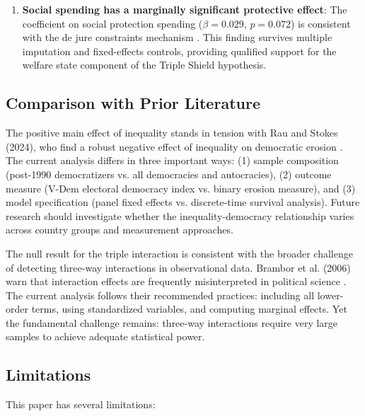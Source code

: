 \documentclass[11pt,letterpaper]{article}
\begin{document}
\begin{enumerate}
    \item \textbf{Social spending has a marginally significant protective effect}: The coefficient on social protection spending ($\beta = 0.029$, $p = 0.072$) is consistent with the de jure constraints mechanism \cite{Orenstein2008, Haggard2021}. This finding survives multiple imputation and fixed-effects controls, providing qualified support for the welfare state component of the Triple Shield hypothesis.
\end{enumerate}

\subsection{Comparison with Prior Literature}

The positive main effect of inequality stands in tension with Rau and Stokes (2024), who find a robust negative effect of inequality on democratic erosion \cite{Rau2024}. The current analysis differs in three important ways: (1) sample composition (post-1990 democratizers vs. all democracies and autocracies), (2) outcome measure (V-Dem electoral democracy index vs. binary erosion measure), and (3) model specification (panel fixed effects vs. discrete-time survival analysis). Future research should investigate whether the inequality-democracy relationship varies across country groups and measurement approaches.

The null result for the triple interaction is consistent with the broader challenge of detecting three-way interactions in observational data. Brambor et al. (2006) warn that interaction effects are frequently misinterpreted in political science \cite{Brambor2006}. The current analysis follows their recommended practices: including all lower-order terms, using standardized variables, and computing marginal effects. Yet the fundamental challenge remains: three-way interactions require very large samples to achieve adequate statistical power.

\subsection{Limitations}

This paper has several limitations:
\end{document}
